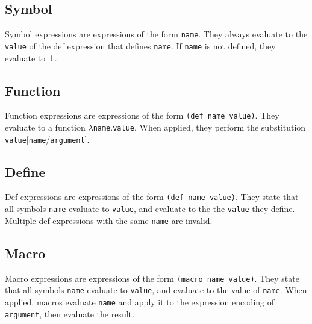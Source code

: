 \documentclass{article}
\newcommand{\comm}[1]{}
\begin{document}
    \begin{multicols}{\comm{2}}
        \subsection{Symbol}\label{subsec:symbol}

        \begin{minipage}{\columnwidth}
            Symbol expressions are expressions of the form \texttt{name}.
            They always evaluate to the \texttt{value} of the def expression that defines \texttt{name}.
            If \texttt{name} is not defined, they evaluate to $\bot$.
        \end{minipage}

        \subsection{Function}\label{subsec:function}

        \begin{minipage}{\columnwidth}
            Function expressions are expressions of the form \lstinline{(def name value)}.
            They evaluate to a function $\lambda$\texttt{name}.\texttt{value}.
            When applied, they perform the substitution \texttt{value}[\texttt{name}/\texttt{argument}].
        \end{minipage}

        \subsection{Define}\label{subsec:def}

        \begin{minipage}{\columnwidth}
            Def expressions are expressions of the form \lstinline{(def name value)}.
            They state that all symbols \texttt{name} evaluate to \texttt{value}, and evaluate to the the \texttt{value} they define.
            Multiple def expressions with the same \texttt{name} are invalid.
        \end{minipage}

        \subsection{Macro}\label{subsec:macro}

        \begin{minipage}{\columnwidth}
            Macro expressions are expressions of the form \lstinline{(macro name value)}.
            They state that all symbols \texttt{name} evaluate to \texttt{value}, and evaluate to the value of \texttt{name}.
            When applied, macros evaluate \texttt{name} and apply it to the expression encoding of \texttt{argument}, then evaluate the result.
        \end{minipage}


\end{multicols}
\end{document}
